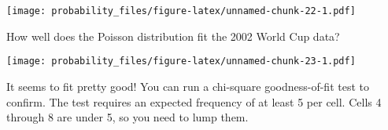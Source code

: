 \documentclass[
]{book}
\newenvironment{Shaded}{\begin{snugshade}}{\end{snugshade}}
\newcommand{\CommentTok}[1]{\textcolor[rgb]{0.56,0.35,0.01}{\textit{#1}}}
\newcommand{\DataTypeTok}[1]{\textcolor[rgb]{0.13,0.29,0.53}{#1}}
\newcommand{\KeywordTok}[1]{\textcolor[rgb]{0.13,0.29,0.53}{\textbf{#1}}}
\newcommand{\NormalTok}[1]{#1}
\newcommand{\OperatorTok}[1]{\textcolor[rgb]{0.81,0.36,0.00}{\textbf{#1}}}
\newcommand{\StringTok}[1]{\textcolor[rgb]{0.31,0.60,0.02}{#1}}
\begin{document}
\texttt{[image: probability\_files/figure-latex/unnamed-chunk-22-1.pdf]}

How well does the Poisson distribution fit the 2002 World Cup data?

\begin{Shaded}
\end{Shaded}

\texttt{[image: probability\_files/figure-latex/unnamed-chunk-23-1.pdf]}

It seems to fit pretty good! You can run a chi-square goodness-of-fit test to confirm. The test requires an expected frequency of at least 5 per cell. Cells 4 through 8 are under 5, so you need to lump them.
\end{document}
